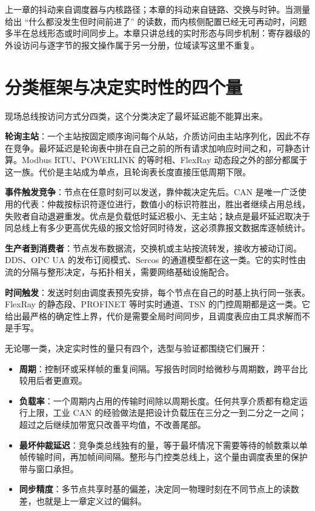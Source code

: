 \documentclass[12pt,a4paper,fontset=fandol]{ctexbook}
\begin{document}
上一章的抖动来自调度器与内核路径；本章的抖动来自链路、交换与时钟。当测量给出 ``什么都没发生但时间前进了'' 的读数，而内核侧配置已经无可再动时，问题多半在总线形态或时间同步上。本章只讲总线的实时形态与同步机制：寄存器级的外设访问与逐字节的报文操作属于另一分册，位域读写这里不重复。

\section{分类框架与决定实时性的四个量}

现场总线按访问方式分四类，这个分类决定了最坏延迟能不能算出来。

\textbf{轮询主站}：一个主站按固定顺序询问每个从站，介质访问由主站序列化，因此不存在竞争。最坏延迟是轮询表中排在自己之前的所有请求加响应时间之和，可静态计算。Modbus RTU、POWERLINK 的等时相、FlexRay 动态段之外的部分都属于这一族。代价是主站成为单点，且轮询表长度直接压低周期下限。

\textbf{事件触发竞争}：节点在任意时刻可以发送，靠仲裁决定先后。CAN 是唯一广泛使用的代表：仲裁按标识符逐位进行，数值小的标识符胜出，胜出者继续占用总线，失败者自动退避重发。优点是负载低时延迟极小、无主站；缺点是最坏延迟取决于同总线上有多少更高优先级的报文恰好同时待发，这必须靠报文数据库逐帧统计。

\textbf{生产者到消费者}：节点发布数据流，交换机或主站按流转发，接收方被动订阅。DDS、OPC UA 的发布订阅模式、Sercos 的通道模型都在这一类。它的实时性由流的分隔与整形决定，与拓扑相关，需要网络基础设施配合。

\textbf{时间触发}：发送时刻由调度表预先安排，每个节点在自己的时基上执行同一张表。FlexRay 的静态段、PROFINET 等时实时通道、TSN 的门控周期都是这一类。它给出最严格的确定性上界，代价是需要全局时间同步，且调度表应由工具求解而不是手写。

无论哪一类，决定实时性的量只有四个，选型与验证都围绕它们展开：

\begin{itemize}
  \item \textbf{周期}：控制环或采样帧的重复间隔。写报告时同时给微秒与周期数，跨平台比较用后者更直观。
  \item \textbf{负载率}：一个周期内占用的传输时间除以周期长度。任何共享介质都有稳定运行上限，工业 CAN 的经验做法是把设计负载压在三分之一到二分之一之间；超过之后继续加带宽只改善平均值，不改善尾部。
  \item \textbf{最坏仲裁延迟}：竞争类总线独有的量，等于最坏情况下需要等待的帧数乘以单帧传输时间，再加帧间间隔。整形与门控类总线上，这个量由调度表里的保护带与窗口承担。
  \item \textbf{同步精度}：多节点共享时基的偏差，决定同一物理时刻在不同节点上的读数差，也就是上一章定义过的偏斜。
\end{itemize}
\end{document}
